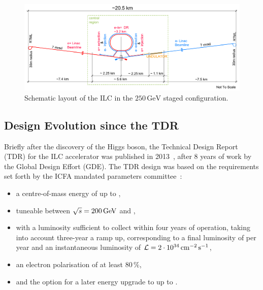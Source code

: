  \begin{figure}[tb]
 \begin{center}
 \includegraphics[width=\hsize]{chapters/figures/TDR-machine-layout-cartoon-staged-mirror.pdf}
\caption{Schematic layout of the ILC in the $250\,{\mathrm{GeV}}$ staged configuration.
\label{fig:ilc-schematic}}
 \end{center}
 \end{figure}

\subsection{Design Evolution since the TDR}
\label{sec:design_evo}

Briefly after the discovery of the Higgs boson, the Technical Design Report (TDR) for the ILC accelerator was published in 2013~\cite{Adolphsen:2013jya,Adolphsen:2013kya}, after 8 years of work by the Global Design Effort (GDE).
The TDR design was based on the requirements set forth by the ICFA mandated parameters committee~\cite{Heuer:2006}:
\begin{itemize}
\item a centre-of-mass energy of up to ,
\item tuneable between $\sqrt{s} = 200\,{\mathrm{GeV}}$ and ,
\item with a luminosity sufficient to collect  within four years of operation, taking into account three-year a ramp up, corresponding to a final luminosity of  per year and an instantaneous luminosity of ${\mathcal{L}} = 2 \cdot 10^{34}\,{\mathrm{cm^{-2}\,s^{-1}}}$,
\item an electron polarisation of at least $80\,\%$,
\item and the option for a later energy upgrade to up to .
\end{itemize}

